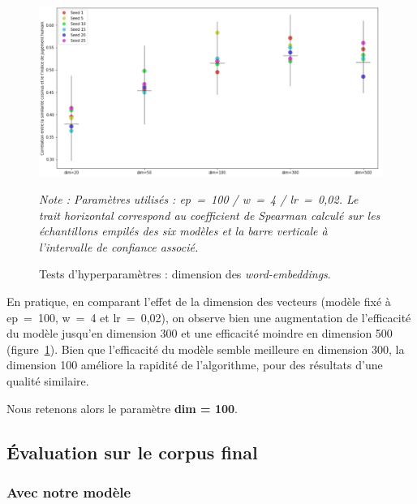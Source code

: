 \documentclass[11pt,french,french]{article}
\begin{document}
\begin{figure}[htp]
\begin{center}
\includegraphics[width=1\textwidth]{img/test_parametres2.png}
\captionsetup{margin=0cm,format=hang,justification=justified}
\caption{Tests d'hyperparamètres : dimension des \emph{word-embeddings}.}\label{fig:figure_dim}
\end{center}
\vspace{-0.3cm}
\footnotesize
\emph{Note : Paramètres utilisés : ep = 100 / w = 4 / lr = 0,02.\newline
Le trait horizontal correspond au coefficient de Spearman calculé sur les échantillons empilés des six modèles et la barre verticale à l'intervalle de confiance associé.}
\end{figure}

En pratique, en comparant l'effet de la dimension des vecteurs (modèle fixé à ep~=~100, w~=~4 et lr~=~0,02), on observe bien une augmentation de l'efficacité du modèle jusqu'en dimension 300 et une efficacité moindre en dimension 500 (figure~\ref{fig:figure_dim}).
Bien que l'efficacité du modèle semble meilleure en dimension 300, la dimension 100 améliore la rapidité de l'algorithme, pour des résultats d'une qualité similaire.

\faArrowCircleRight{} Nous retenons alors le paramètre \textbf{dim = 100}.

\hypertarget{uxe9valuation-sur-le-corpus-final}{%
\subsection{Évaluation sur le corpus final}\label{uxe9valuation-sur-le-corpus-final}}

\hypertarget{avec-notre-moduxe8le}{%
\subsubsection{\texorpdfstring{Avec \og notre \fg modèle}{Avec notre modèle}}\label{avec-notre-moduxe8le}}
\end{document}
